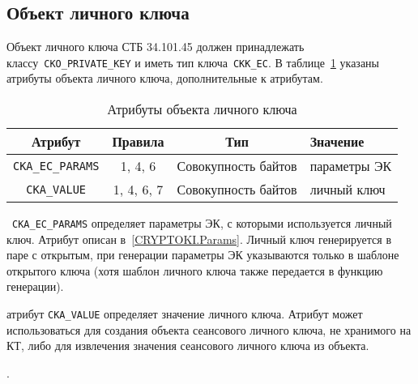 


\subsection{Объект личного ключа}\label{CRYPTOKI.Privkey}


Объект личного ключа СТБ 34.101.45 должен принадлежать
классу~\verb|CKO_PRIVATE_KEY| и иметь тип ключа~\verb|CKK_EC|.
В таблице~\ref{Table.CRYPTOKI.EcPrivkeyAttrs} указаны 
 атрибуты объекта личного ключа, дополнительные к 
 атрибутам.

\begin{table}[H]
\caption{Атрибуты объекта личного ключа}\label{Table.CRYPTOKI.EcPrivkeyAttrs}
\begin{tabular}{|c|c|c|p{5cm}|}
\hline
Атрибут & Правила & Тип & Значение\\
\hline
\hline
\verb|CKA_EC_PARAMS| & 1, 4, 6 & Совокупность байтов &
параметры ЭК\\
\hline
\verb|CKA_VALUE| & 1, 4, 6, 7 & Совокупность байтов &
личный ключ\\
\hline
\end{tabular}
\end{table}


~\verb|CKA_EC_PARAMS| определяет параметры 
ЭК, с которыми используется личный ключ. Атрибут описан 
в~\ref{CRYPTOKI.Params}.  
%
Личный ключ генерируется в паре с открытым,
при генерации параметры ЭК указываются только в шаблоне
открытого ключа (хотя шаблон личного ключа также передается в 
функцию генерации).

 атрибут \verb|CKA_VALUE| определяет значение 
личного ключа. Атрибут может использоваться для
создания объекта сеансового личного ключа, не хранимого на КТ, либо для 
извлечения значения сеансового личного ключа из объекта. 

.

